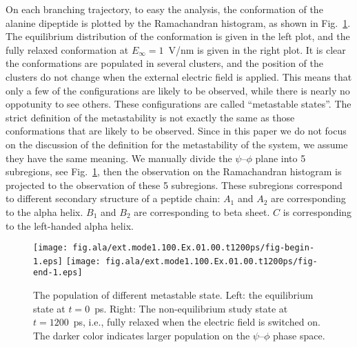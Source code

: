 \documentclass[aip,jcp,a4paper,preprint,onecolumn]{revtex4-1}
\begin{document}
On each branching trajectory, to easy the analysis, the conformation
of the alanine dipeptide is plotted by the Ramachandran histogram, as
shown in Fig.~\ref{fig:tmp4}. The equilibrium distribution of the
conformation is given in the left plot, and the fully relaxed
conformation at $E_{\infty} = 1$~V/nm is given in the right plot.  It is
clear the conformations are populated in several clusters, and the
position of the clusters do not change when the external electric
field is applied. This means that only a few of the configurations are likely to be observed, while there is nearly
no oppotunity to see others. 
These configurations are called ``metastable states''. The strict definition of the
metastability is not exactly the same as those conformations that are likely to be observed.
Since in this paper we do not focus on the discussion of the definition for the metastability of the system,
we assume they have the same meaning.
We manually divide the
$\psi$--$\phi$ plane into 5 subregions, see Fig.~\ref{fig:tmp4},
then the observation on the Ramachandran histogram is projected to the
observation of these 5 subregions.  These subregions
correspond to different secondary structure of a peptide chain:
$A_1$ and $A_2$ are
corresponding to the alpha helix. $B_1$ and $B_2$ are
corresponding to beta sheet. $C$ is corresponding to the
left-handed alpha helix.

\begin{figure}
  \centering
  \texttt{[image: fig.ala/ext.mode1.100.Ex.01.00.t1200ps/fig-begin-1.eps]}
  \texttt{[image: fig.ala/ext.mode1.100.Ex.01.00.t1200ps/fig-end-1.eps]}
  \caption{The population of different metastable state. Left: the equilibrium state at $t=0$~\textsf{ps}. Right: The non-equilibrium study state at $t=1200$~\textsf{ps}, i.e., fully relaxed when the electric field is switched on. The darker color indicates larger population on the $\psi$--$\phi$ phase space.}
  \label{fig:tmp4}
\end{figure}
\end{document}
